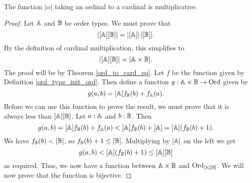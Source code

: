 \documentclass[../../math.tex]{subfiles}
\begin{document}
\begin{instance}
    The function $|\alpha|$ taking an ordinal to a cardinal is multiplicative.
\end{instance}
\begin{proof}
    Let $\mathbb{A}$ and $\mathbb{B}$ be order types.  We must prove that
    \[
        |[\mathbb{A}][\mathbb{B}]| = |[\mathbb{A}]|\,|[\mathbb{B}]|.
    \]
    By the definition of cardinal multiplication, this simplifies to
    \[
        |[\mathbb{A}][\mathbb{B}]| = |\mathbb{A} \times \mathbb{B}].
    \]
    The proof will be by Theorem \ref{ord_to_card_eq}.  Let $f$ be the function
    given by Definition \ref{ord_type_init_ord}.  Then define a function $g : \mathbb{A}
    \times \mathbb{B} \to \operatorname{Ord}$ given by
    \[
        g(a, b) = [\mathbb{A}] f_{\mathbb{B}}(b) + f_{\mathbb{A}}(a).
    \]
    Before we can use this function to prove the result, we must prove that it
    is always less than $[\mathbb{A}] [\mathbb{B}]$.  Let $a : \mathbb{A}$ and $b : \mathbb{B}$.  Then
    \[
        g(a, b) = [\mathbb{A}] f_{\mathbb{B}}(b) + f_{\mathbb{A}}(a) < [\mathbb{A}] f_{\mathbb{B}}(b) + [\mathbb{A}] = [\mathbb{A}] (f_{\mathbb{B}}(b) +
        1).
    \]
    We have $f_{\mathbb{B}}(b) < [\mathbb{B}]$, so $f_{\mathbb{B}}(b) + 1 \leq [\mathbb{B}]$.  Multiplying by $[\mathbb{A}]$
    on the left we get
    \[
        g(a, b) < [\mathbb{A}] (f_{\mathbb{B}}(b) + 1) \leq [\mathbb{A}] [\mathbb{B}]
    \]
    as required.  Thus, we now have a function between $\mathbb{A} \times \mathbb{B}$ and
    $\operatorname{Ord}_{[\mathbb{A}] [\mathbb{B}]}$.  We will now prove that the function is bijective.


\end{proof}
\end{document}
